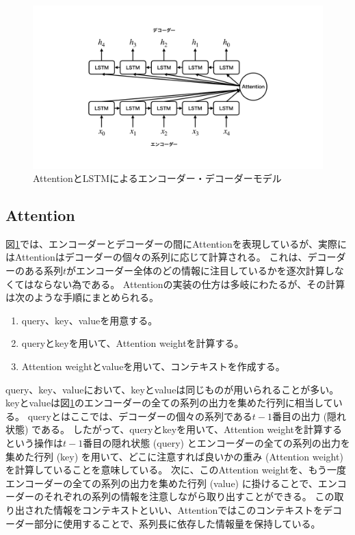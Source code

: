 \begin{figure}[h]
 \centering
 \includegraphics[trim = 100 100 100 100, width=1.0\textwidth, clip]{Figure/2DeepLearning/19EncoderDecoderAttention.png}
 \caption{AttentionとLSTMによるエンコーダー・デコーダーモデル}
 \label{19EncoderDecoderAttention}
\end{figure}


\subsection{Attention} \label{DL:Atten:Attention}

図\ref{19EncoderDecoderAttention}では、エンコーダーとデコーダーの間にAttentionを表現しているが、実際にはAttentionはデコーダーの個々の系列に応じて計算される。
これは、デコーダーのある系列$t$がエンコーダー全体のどの情報に注目しているかを逐次計算しなくてはならない為である。
Attentionの実装の仕方は多岐にわたるが、その計算は次のような手順にまとめられる。

\begin{enumerate}
  \item query、key、valueを用意する。
  \item queryとkeyを用いて、Attention weightを計算する。
  \item Attention weightとvalueを用いて、コンテキストを作成する。
\end{enumerate}

query、key、valueにおいて、keyとvalueは同じものが用いられることが多い。
keyとvalueは図\ref{19EncoderDecoderAttention}のエンコーダーの全ての系列の出力を集めた行列に相当している。
queryとはここでは、デコーダーの個々の系列である$t-1$番目の出力 (隠れ状態) である。
したがって、queryとkeyを用いて、Attention weightを計算するという操作は$t-1$番目の隠れ状態 (query) とエンコーダーの全ての系列の出力を集めた行列 (key) を用いて、どこに注意すれば良いかの重み (Attention weight) を計算していることを意味している。
次に、このAttention weightを、もう一度エンコーダーの全ての系列の出力を集めた行列 (value) に掛けることで、エンコーダーのそれぞれの系列の情報を注意しながら取り出すことができる。
この取り出された情報をコンテキストといい、Attentionではこのコンテキストをデコーダー部分に使用することで、系列長に依存した情報量を保持している。

